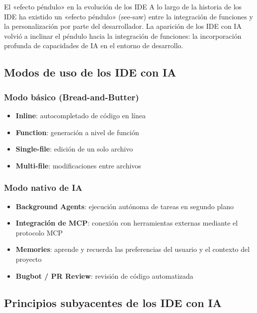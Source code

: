 \documentclass[a4paper]{article}
\begin{document}
\begin{knowledgebox}{El «efecto péndulo» en la evolución de los IDE}
A lo largo de la historia de los IDE ha existido un «efecto péndulo» (see-saw) entre la integración de funciones y la personalización por parte del desarrollador. La aparición de los IDE con IA volvió a inclinar el péndulo hacia la integración de funciones: la incorporación profunda de capacidades de IA en el entorno de desarrollo.
\end{knowledgebox}

\subsection{Modos de uso de los IDE con IA}

\subsubsection{Modo básico (Bread-and-Butter)}

\begin{itemize}
    \item \textbf{Inline}: autocompletado de código en línea
    \item \textbf{Function}: generación a nivel de función
    \item \textbf{Single-file}: edición de un solo archivo
    \item \textbf{Multi-file}: modificaciones entre archivos
\end{itemize}

\subsubsection{Modo nativo de IA}

\begin{itemize}
    \item \textbf{Background Agents}: ejecución autónoma de tareas en segundo plano
    \item \textbf{Integración de MCP}: conexión con herramientas externas mediante el protocolo MCP
    \item \textbf{Memories}: aprende y recuerda las preferencias del usuario y el contexto del proyecto
    \item \textbf{Bugbot / PR Review}: revisión de código automatizada
\end{itemize}

\subsection{Principios subyacentes de los IDE con IA}
\end{document}
